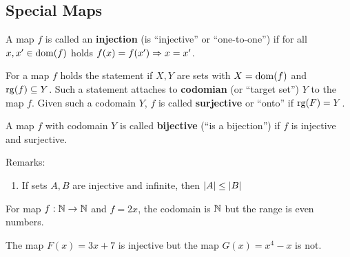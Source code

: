 \documentclass[12pt]{book}
\begin{document}
\subsection{Special Maps}
\label{sec:Specialmaps}

\begin{defi}\label{def:inj}
      A map $f$ is called an \textbf{injection} (is ``injective'' or ``one-to-one'') if for all $x, x' \in \operatorname{dom}(f)$ holds $f(x) = f(x') \Rightarrow x = x'$.
\end{defi}
\begin{defi}\label{def:surj}
      For a map $f$ holds the statement  if $X, Y$ are sets with $X = \operatorname{dom}(f)$ and $\operatorname{rg}(f) \subseteq Y$. Such a statement attaches to 
	  \textbf{codomian} (or ``target set'') $Y$ to the map $f$. Given such a codomain $Y$, $f$ is called \textbf{surjective} or ``onto'' if $\operatorname{rg}(F) = Y$.
\end{defi}
\begin{defi}\label{def:bij}
      A map $f$ with codomain $Y$ is called \textbf{bijective} (``is a bijection'') if $f$ is injective and surjective.
\end{defi}
Remarks:
\begin{enumerate}
      \item If sets $A , B$ are injective and infinite, then $\lvert A \rvert \leq \lvert B \rvert$
\end{enumerate}
\begin{examp}\label{exp:Specialmaps1}
      For map $f: \mathbb{N} \to \mathbb{N}$ and $f=2x$, the codomain is $\mathbb{N}$ but the range is even numbers.
\end{examp}

\begin{examp}\label{exp:Specialmaps2}
      The map $F(x) = 3 x + 7$ is injective but the map $G(x) = x^4 - x$ is not.
\end{examp}
\end{document}
